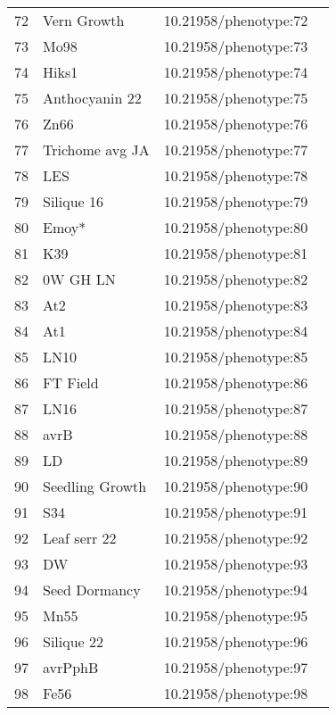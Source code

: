\begin{longtable}{p{} p{} p{} p{}}
 72 & Vern Growth & 10.21958/phenotype:72 & \cite{atwell2010}\\
 73 & Mo98 & 10.21958/phenotype:73 & \cite{atwell2010}\\
 74 & Hiks1 & 10.21958/phenotype:74 & \cite{atwell2010}\\
 75 & Anthocyanin 22 & 10.21958/phenotype:75 & \cite{atwell2010}\\
 76 & Zn66 & 10.21958/phenotype:76 & \cite{atwell2010}\\
 77 & Trichome avg JA & 10.21958/phenotype:77 & \cite{atwell2010}\\
 78 & LES & 10.21958/phenotype:78 & \cite{atwell2010}\\
 79 & Silique 16 & 10.21958/phenotype:79 & \cite{atwell2010}\\
 80 & Emoy* & 10.21958/phenotype:80 & \cite{atwell2010}\\
 81 & K39 & 10.21958/phenotype:81 & \cite{atwell2010}\\
 82 & 0W GH LN & 10.21958/phenotype:82 & \cite{atwell2010}\\
 83 & At2 & 10.21958/phenotype:83 & \cite{atwell2010}\\
 84 & At1 & 10.21958/phenotype:84 & \cite{atwell2010}\\
 85 & LN10 & 10.21958/phenotype:85 & \cite{atwell2010}\\
 86 & FT Field & 10.21958/phenotype:86 & \cite{atwell2010}\\
 87 & LN16 & 10.21958/phenotype:87 & \cite{atwell2010}\\
 88 & avrB & 10.21958/phenotype:88 & \cite{atwell2010}\\
 89 & LD & 10.21958/phenotype:89 & \cite{atwell2010}\\
 90 & Seedling Growth & 10.21958/phenotype:90 & \cite{atwell2010}\\
 91 & S34 & 10.21958/phenotype:91 & \cite{atwell2010}\\
 92 & Leaf serr 22 & 10.21958/phenotype:92 & \cite{atwell2010}\\
 93 & DW & 10.21958/phenotype:93 & \cite{atwell2010}\\
 94 & Seed Dormancy & 10.21958/phenotype:94 & \cite{atwell2010}\\
 95 & Mn55 & 10.21958/phenotype:95 & \cite{atwell2010}\\
 96 & Silique 22 & 10.21958/phenotype:96 & \cite{atwell2010}\\
 97 & avrPphB & 10.21958/phenotype:97 & \cite{atwell2010}\\
 98 & Fe56 & 10.21958/phenotype:98 & \cite{atwell2010}\\

\end{longtable}
